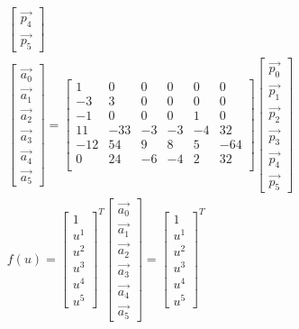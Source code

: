 \documentclass{letter}
\begin{document}
\begin{align*}
\begin{bmatrix}
\vec{p_4} \\
\vec{p_5} 
\end{bmatrix}
\\
\begin{bmatrix}
\vec{a_0} \\
\vec{a_1} \\
\vec{a_2} \\
\vec{a_3} \\
\vec{a_4} \\
\vec{a_5} 
\end{bmatrix}
=
\begin{bmatrix}
1 & 0 & 0 & 0 & 0 & 0 \\
-3 & 3 & 0 & 0 & 0 & 0 \\
-1 & 0 & 0 & 0 & 1 & 0 \\
11 & -33 & -3 & -3 & -4 & 32 \\
-12 & 54 & 9 & 8 & 5 & -64 \\
0 & 24 & -6 & -4 & 2 & 32 \\
\end{bmatrix}
\begin{bmatrix}
\vec{p_0} \\
\vec{p_1} \\
\vec{p_2} \\
\vec{p_3} \\
\vec{p_4} \\
\vec{p_5} 
\end{bmatrix}
\\
f(u) =
\begin{bmatrix}
1 \\
{u^1} \\
{u^2} \\
{u^3} \\
{u^4} \\
{u^5} 
\end{bmatrix}^{T}
\begin{bmatrix}
\vec{a_0} \\
\vec{a_1} \\
\vec{a_2} \\
\vec{a_3} \\
\vec{a_4} \\
\vec{a_5} 
\end{bmatrix}
=
\begin{bmatrix}
1 \\
{u^1} \\
{u^2} \\
{u^3} \\
{u^4} \\
{u^5} 
\end{bmatrix}^{T}

\end{align*}
\end{document}
